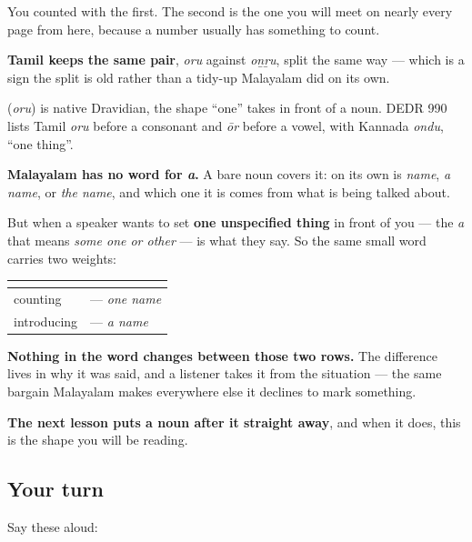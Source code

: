You counted with the first. The second is the one you will meet on nearly every page from here, because a number usually has something to count.

\textbf{Tamil keeps the same pair}, \emph{oru} against \emph{oṉṟu}, split the same way — which is a sign the split is old rather than a tidy-up Malayalam did on its own.

\begin{cousinweb}
\textbf{} (\emph{oru}) is native Dravidian, the shape \textquotedblleft{}one\textquotedblright{} takes in front of a noun. DEDR 990 lists Tamil \emph{oru} before a consonant and \emph{ōr} before a vowel, with Kannada \emph{ondu}, \textquotedblleft{}one thing\textquotedblright{}.
\end{cousinweb}

\begin{grammarlens}[title={Grammar Lens: the same word does the work of \textquotedblleft{}a\textquotedblright{}}]
\textbf{Malayalam has no word for \emph{a}.} A bare noun covers it: \textbf{} on its own is \emph{name}, \emph{a name}, or \emph{the name}, and which one it is comes from what is being talked about.

But when a speaker wants to set \textbf{one unspecified thing} in front of you — the \emph{a} that means \emph{some one or other} — \textbf{} is what they say. So the same small word carries two weights:

\noindent
\begin{tabularx}{\linewidth}{@{}>{\raggedright\arraybackslash}X>{\raggedright\arraybackslash}X@{}}
\toprule
\textbf{} & \textbf{} \\
\midrule
counting & \textbf{\ml{ഒരു} \ml{പേര്}} — \emph{one name} \\
introducing & \textbf{\ml{ഒരു} \ml{പേര്}} — \emph{a name} \\
\bottomrule
\end{tabularx}

\textbf{Nothing in the word changes between those two rows.} The difference lives in why it was said, and a listener takes it from the situation — the same bargain Malayalam makes everywhere else it declines to mark something.

\textbf{The next lesson puts a noun after it straight away}, and when it does, this is the shape you will be reading.
\end{grammarlens}

\subsection*{Your turn}
Say these aloud:

